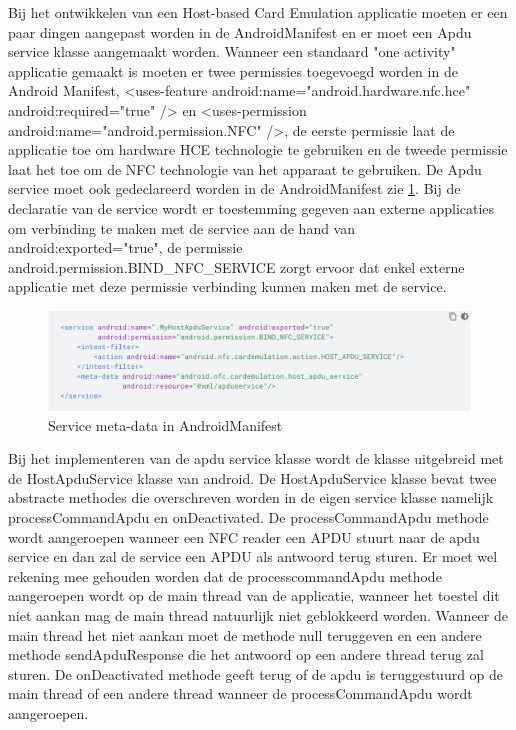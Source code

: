 Bij het ontwikkelen van een Host-based Card Emulation applicatie moeten er een paar dingen aangepast worden in de AndroidManifest en er moet een Apdu service klasse aangemaakt worden. Wanneer een standaard "one activity" applicatie gemaakt is moeten er twee permissies toegevoegd worden in de Android Manifest, <uses-feature android:name="android.hardware.nfc.hce" android:required="true" /> en <uses-permission android:name="android.permission.NFC" />, de eerste permissie laat de applicatie toe om hardware HCE technologie te gebruiken en de tweede permissie laat het toe om de NFC technologie van het apparaat te gebruiken. De Apdu service moet ook gedeclareerd worden in de AndroidManifest zie \ref{fig:Manifest}. Bij de declaratie van de service wordt er toestemming gegeven aan externe applicaties om verbinding te maken met de service aan de hand van android:exported="true", de permissie android.permission.BIND\_NFC\_SERVICE zorgt ervoor dat enkel externe applicatie met deze permissie verbinding kunnen maken met de service.
 
 \begin{figure}
 	\includegraphics[width=\linewidth]
 	{img/ManifestService}
 	\caption{Service meta-data in AndroidManifest}
 	\label{fig:Manifest}
 \end{figure}

Bij het implementeren van de apdu service klasse wordt de klasse uitgebreid met de HostApduService klasse van android. De HostApduService klasse bevat twee abstracte methodes die overschreven worden in de eigen service klasse namelijk processCommandApdu en onDeactivated. De processCommandApdu methode wordt aangeroepen wanneer een NFC reader een APDU stuurt naar de apdu service en dan zal de service een APDU als antwoord terug sturen. Er moet wel rekening mee gehouden worden dat de processcommandApdu methode aangeroepen wordt op de main thread van de applicatie, wanneer het toestel dit niet aankan mag de main thread natuurlijk niet geblokkeerd worden. Wanneer de main thread het niet aankan moet de methode null teruggeven en een andere methode sendApduResponse die het antwoord op een andere thread terug zal sturen. De onDeactivated methode geeft terug of de apdu is teruggestuurd op de main thread of een andere thread wanneer de processCommandApdu wordt aangeroepen.